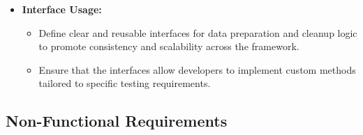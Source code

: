 \begin{itemize}
	\item \textbf{Interface Usage:}
	      \begin{itemize}
		      \item Define clear and reusable interfaces for data preparation and cleanup logic to promote consistency and scalability across the framework.
		      \item Ensure that the interfaces allow developers to implement custom methods tailored to specific testing requirements.
	      \end{itemize}
\end{itemize}

\subsection{Non-Functional Requirements}

